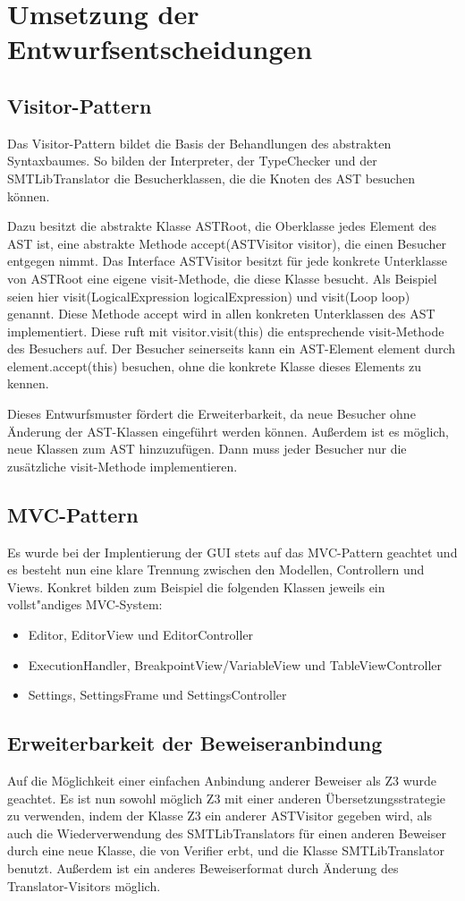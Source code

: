 \section{Umsetzung der Entwurfsentscheidungen}
\subsection{Visitor-Pattern}
Das Visitor-Pattern bildet die Basis der Behandlungen des abstrakten Syntaxbaumes. So bilden der Interpreter, der TypeChecker und der SMTLibTranslator die Besucherklassen, die die Knoten des AST besuchen k\"{o}nnen.

Dazu besitzt die abstrakte Klasse ASTRoot, die Oberklasse jedes Element des AST ist, eine abstrakte Methode accept(ASTVisitor visitor), die einen Besucher entgegen nimmt. 
Das Interface ASTVisitor besitzt für jede konkrete Unterklasse von ASTRoot eine eigene visit-Methode, die diese Klasse besucht. Als Beispiel seien hier
visit(LogicalExpression logicalExpression) und visit(Loop loop) genannt.
Diese Methode accept wird in allen konkreten Unterklassen des AST implementiert. Diese ruft mit visitor.visit(this) die entsprechende visit-Methode des Besuchers auf.
Der Besucher seinerseits kann ein AST-Element element durch element.accept(this) besuchen, ohne die konkrete Klasse dieses Elements zu kennen.

Dieses Entwurfsmuster fördert die Erweiterbarkeit, da neue Besucher ohne Änderung der AST-Klassen eingeführt werden können. Außerdem ist es möglich, neue
Klassen zum AST hinzuzufügen. Dann muss jeder Besucher nur die zusätzliche visit-Methode implementieren.

\subsection{MVC-Pattern}
Es wurde bei der Implentierung der GUI stets auf das MVC-Pattern geachtet und es besteht nun eine klare Trennung zwischen den Modellen, Controllern und Views. Konkret bilden zum Beispiel die folgenden Klassen jeweils ein vollst"andiges MVC-System: 
\begin{itemize}
\item Editor, EditorView und EditorController
\item ExecutionHandler, BreakpointView/VariableView und TableViewController
\item Settings, SettingsFrame und SettingsController
\end{itemize}
\subsection{Erweiterbarkeit der Beweiseranbindung}
Auf die M\"{o}glichkeit einer einfachen Anbindung anderer Beweiser als Z3 wurde geachtet. Es ist nun sowohl m\"{o}glich Z3 mit einer anderen \"{U}bersetzungsstrategie zu verwenden, indem der Klasse Z3 ein anderer ASTVisitor gegeben wird, als auch die Wiederverwendung des SMTLibTranslators f\"{u}r einen anderen Beweiser durch eine neue Klasse, die von Verifier erbt, und die Klasse SMTLibTranslator benutzt. Außerdem ist ein anderes Beweiserformat durch Änderung des Translator-Visitors möglich.